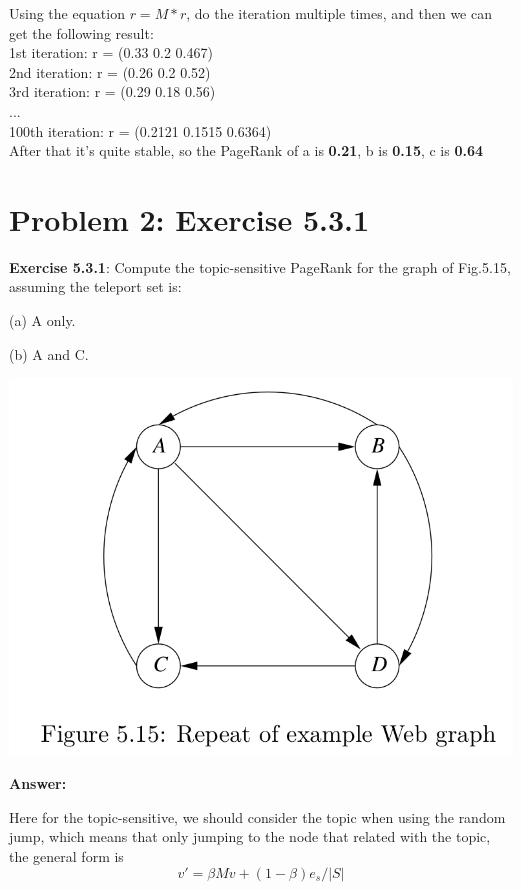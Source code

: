 \documentclass{article}
\begin{document}
Using the equation $r = M * r$, do the iteration multiple times, and then we can get the following result: ~\\
1st iteration: r = (0.33 0.2 0.467) \\
2nd iteration: r = (0.26 0.2 0.52) \\
3rd iteration: r = (0.29 0.18 0.56) \\
... \\
100th iteration: r = (0.2121 0.1515 0.6364) \\

After that it's quite stable, so the PageRank of a is \textbf{0.21}, b is \textbf{0.15}, c is \textbf{0.64} 



\section{Problem 2: Exercise 5.3.1}
\textbf{Exercise 5.3.1}: Compute the topic-sensitive PageRank for the graph of Fig.5.15, assuming the teleport set is:

(a) A only.

(b) A and C.


\begin{center}
\includegraphics[scale=0.3]{hw4_figure_5_15.png}
\end{center}


\textbf{Answer:}

Here for the topic-sensitive, we should consider the topic when using the random jump, which means that only jumping to the node that related with the topic, the general form is $$v' = \beta{}Mv+(1-\beta)e_s/|S|$$
\end{document}
